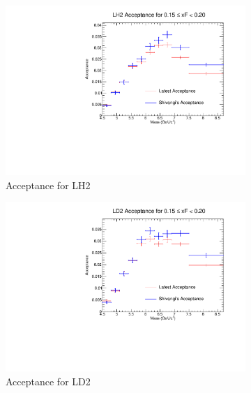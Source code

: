 \documentclass[11pt]{article}
\begin{document}
\begin{figure}[p]
    \centering
    \begin{subfigure}[b]{0.48\textwidth}
       \includegraphics[width=\linewidth]{./acceptancePlots/LH2_acceptance_xF_bin_3.pdf}
       \caption{Acceptance for LH2}
    \end{subfigure}\hfill
    \begin{subfigure}[b]{0.48\textwidth}
       \includegraphics[width=\linewidth]{./acceptancePlots/LD2_acceptance_xF_bin_3.pdf}
       \caption{Acceptance for LD2}
    \end{subfigure}
    \begin{subfigure}[b]{0.48\textwidth}

\end{subfigure}
\end{figure}
\end{document}
